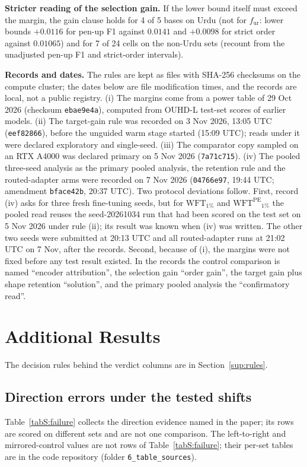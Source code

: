 \documentclass[10pt,a4paper]{article}
\newcommand{\ext}[1]{\par\noindent{\small\itshape Extends in the paper: #1.}\par\smallskip}
\newcommand{\fur}{f_{\mathrm{ur}}}
\newcommand{\WFT}[1]{\mathrm{WFT}_{#1}}
\newcommand{\WFTpe}[1]{\mathrm{WFT}^{\mathrm{PE}}{}_{#1}}
\begin{document}
\textbf{Stricter reading of the selection gain.} If the lower bound itself must exceed the margin, the gain clause holds for 4 of 5 bases on Urdu (not for $\fur$: lower bounds $+0.0116$ for pen-up F1 against $0.0141$ and $+0.0098$ for strict order against $0.01065$) and for 7 of 24 cells on the non-Urdu sets (recount from the unadjusted pen-up F1 and strict-order intervals).

\textbf{Records and dates.} The rules are kept as files with SHA-256 checksums on the compute cluster; the dates below are file modification times, and the records are local, not a public registry. (i) The margins come from a power table of 29 Oct 2026 (checksum \texttt{ebae9e4a}), computed from OUHD-L test-set scores of earlier models. (ii) The target-gain rule was recorded on 3 Nov 2026, 13:05 UTC (\texttt{eef82866}), before the unguided warm stage started (15:09 UTC); reads under it were declared exploratory and single-seed. (iii) The comparator copy sampled on an RTX A4000 was declared primary on 5 Nov 2026 (\texttt{7a71c715}). (iv) The pooled three-seed analysis as the primary pooled analysis, the retention rule and the routed-adapter arms were recorded on 7 Nov 2026 (\texttt{04766e97}, 19:44 UTC; amendment \texttt{bface42b}, 20:37 UTC). Two protocol deviations follow. First, record (iv) asks for three fresh fine-tuning seeds, but for $\WFT{1\%}$ and $\WFTpe{1\%}$ the pooled read reuses the seed-20261034 run that had been scored on the test set on 5 Nov 2026 under rule (ii); its result was known when (iv) was written. The other two seeds were submitted at 20:13 UTC and all routed-adapter runs at 21:02 UTC on 7 Nov, after the records. Second, because of (i), the margins were not fixed before any test result existed. In the records the control comparison is named ``encoder attribution'', the selection gain ``order gain'', the target gain plus shape retention ``solution'', and the primary pooled analysis the ``confirmatory read''.
\FloatBarrier

\section{Additional Results}\label{sup:results}

The decision rules behind the verdict columns are in Section~\ref{sup:rules}.

\subsection{Direction errors under the tested shifts}\label{sup:failure}
\ext{Introduction; Discussion}
Table~\ref{tabS:failure} collects the direction evidence named in the paper; its rows are scored on different sets and are not one comparison. The left-to-right and mirrored-control values are not rows of Table~\ref{tabS:failure}; their per-set tables are in the code repository (folder \texttt{6\_table\_sources}).
\end{document}
